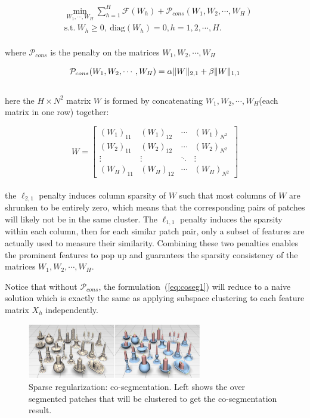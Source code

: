 \small{
\begin{equation}
 \label{eq:coseg1}
 \begin{split}
 &\min_{W_{1},\cdots,W_{H}}\sum_{h=1}^{H}\mathcal{F}(W_{h})+\mathcal{P}_{cons}(W_1,W_2,\cdots,W_H)\\
 &\mathrm{s.t.}~W_{h}\ge0,~\textrm{diag}(W_{h})=0,h=1,2,\cdots,H.
 \end{split}
\end{equation}
}
\\
where $\mathcal{P}_{cons}$ is the penalty on the matrices $W_1,W_2,\cdots,W_H$

\small{
\begin{equation}
 \label{eq:coseg2}
 \mathcal{P}_{cons}(W_1,W_2,\cdots,W_H)=\alpha\|W\|_{2,1}+\beta\|W\|_{1,1}\\
\end{equation}
}
\\
here the $H\times N^2$ matrix $W$ is formed by concatenating $W_1,W_2,\cdots,W_H$(each matrix in one row) together:

\small{
\begin{equation}
 \label{eq:coseg3}
 W = {\left[ \begin{array}{cccc}
 (W_1)_{11} & (W_1)_{12} & \cdots & (W_1)_{N^2}\\
 (W_2)_{11} & (W_2)_{12} & \cdots & (W_2)_{N^2}\\
 \vdots & \vdots & \ddots & \vdots\\
 (W_{H})_{11} & (W_{H})_{12} & \cdots & (W_{H})_{N^2}
 \end{array}
 \right]}
\end{equation}
}
\\
the $\ell_{2,1}$ penalty induces column sparsity of $W$ such that most columns of $W$ are shrunken to be entirely zero, which means that the corresponding pairs of patches will likely not be in the same cluster.
The $\ell_{1,1}$ penalty induces the sparsity within each column, then for each similar patch pair, only a subset of features are actually used to measure their similarity.
Combining these two penalties enables the prominent features to pop up and guarantees the sparsity consistency of the matrices $W_1,W_2,\cdots,W_H$.

Notice that without $\mathcal{P}_{cons}$, the formulation~(\ref{eq:coseg1}) will reduce to a naive solution which is exactly the same as applying subspace clustering to each feature matrix $X_{h}$ independently.

\begin{figure}[ht]
  \centering
  \includegraphics[width=3in]{images/co-segmentation}
  \caption{Sparse regularization: co-segmentation\cite{hu2012co}. Left shows the over segmented patches that will be clustered to get the co-segmentation result.}
  \label{fig:co-segmentation}
\end{figure}

